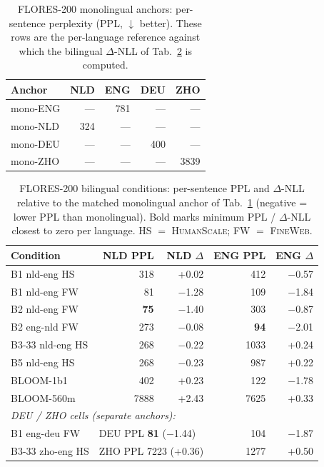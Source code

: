\begin{table}[t]
  \centering
  \small
  \caption{\textsc{FLORES-200} monolingual anchors: per-sentence perplexity (PPL, $\downarrow$ better). These rows are the per-language reference against which the bilingual $\Delta$-NLL of Tab.~\ref{tab:flores_bi} is computed.}
  \label{tab:flores_mono}
  \begin{tabular}{lrrrr}
    \toprule
    Anchor & NLD & ENG & DEU & ZHO \\
    \midrule
    mono-ENG & ---  & 781 & ---  & ---  \\
    mono-NLD & 324  & --- & ---  & ---  \\
    mono-DEU & ---  & --- & 400  & ---  \\
    mono-ZHO & ---  & --- & ---  & 3839 \\
    \bottomrule
  \end{tabular}
\end{table}

\begin{table}[!ht]
  \centering
  \small
  \caption{\textsc{FLORES-200} bilingual conditions: per-sentence PPL and $\Delta$-NLL relative to the matched monolingual anchor of Tab.~\ref{tab:flores_mono} (negative = lower PPL than monolingual). Bold marks minimum PPL / $\Delta$-NLL closest to zero per language. HS $=$ \textsc{HumanScale}; FW $=$ \textsc{FineWeb}.}
  \label{tab:flores_bi}
  \begin{tabular}{lrrrr}
    \toprule
    Condition & NLD PPL & NLD $\Delta$ & ENG PPL & ENG $\Delta$ \\
    \midrule
    B1 nld-eng HS  & 318 & +0.02   & 412 & $-$0.57 \\
    B1 nld-eng FW  & 81  & $-$1.28 & 109 & $-$1.84 \\
    B2 nld-eng FW  & \textbf{75} & $-$1.40 & 303 & $-$0.87 \\
    B2 eng-nld FW  & 273 & $-$0.08 & \textbf{94} & $-$2.01 \\
    B3-33 nld-eng HS & 268 & $-$0.22 & 1033 & +0.24 \\
    B5 nld-eng HS  & 268 & $-$0.23 & 987 & +0.22 \\
    BLOOM-1b1      & 402 & +0.23   & 122 & $-$1.78 \\
    BLOOM-560m     & 7888 & +2.43  & 7625 & +0.33 \\
    \midrule
    \multicolumn{5}{l}{\emph{DEU / ZHO cells (separate anchors):}} \\
    B1 eng-deu FW  & \multicolumn{2}{l}{DEU PPL \textbf{81} ($-$1.44)} & 104 & $-$1.87 \\
    B3-33 zho-eng HS & \multicolumn{2}{l}{ZHO PPL 7223 (+0.36)} & 1277 & +0.50 \\
    \bottomrule
  \end{tabular}
\end{table}

